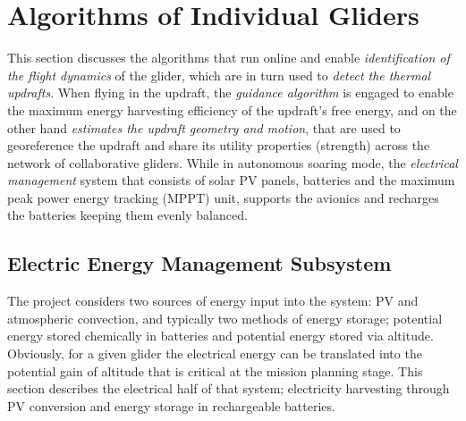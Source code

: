 \documentclass{ifacconf}
\newcommand{\squeezeup}{\vspace{-3.0mm}}
\begin{document}
\section{ Algorithms of Individual Gliders}
\label{sec:IndAlgs} \squeezeup This section discusses the algorithms that run
online and enable \emph{identification of the flight dynamics} of the glider,
which are in turn used to \emph{detect the thermal updrafts}. When flying in
the updraft, the \emph{guidance algorithm} is engaged to enable the maximum
energy harvesting efficiency of the updraft's free energy, and on the other
hand \emph{estimates the updraft geometry and motion}, that are used to
georeference the updraft and share its utility properties (strength) across
the network of collaborative gliders.
%
%
While in autonomous soaring mode, the \emph{electrical management} system
that consists of solar PV panels, batteries and the maximum peak power energy
tracking (MPPT) unit, supports the avionics and recharges the batteries
keeping them evenly balanced.\squeezeup

%

\subsection{Electric Energy Management Subsystem}
\label{subsec:Electric}
\squeezeup

The project considers two sources of energy input into the system: PV and
atmospheric convection, and typically two methods of energy storage;
potential energy stored chemically in batteries and potential energy stored
via altitude. Obviously, for a given glider the electrical energy can be
translated into the potential gain of altitude that is critical at the
mission planning stage. This section describes the electrical half of that
system; electricity harvesting through PV conversion and energy storage in
rechargeable batteries.
\end{document}
